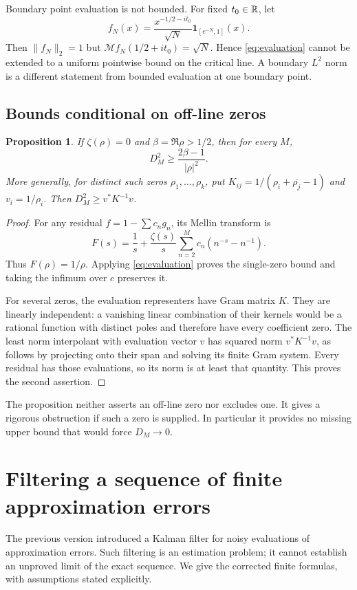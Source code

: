 \documentclass[11pt]{amsart}
\newtheorem{proposition}[theorem]{Proposition}
\theoremstyle{definition}
\begin{document}
Boundary point evaluation is not bounded. For fixed $t_0\in\mathbb R$, let
\[
 f_N(x)=\frac{x^{-1/2-it_0}}{\sqrt N}
              \boldsymbol1_{[e^{-N},1]}(x).
\]
Then $\|f_N\|_2=1$ but
$\mathcal Mf_N(1/2+it_0)=\sqrt N$.
Hence \eqref{eq:evaluation} cannot be extended to a uniform pointwise
bound on the critical line. A boundary $L^2$ norm is a different
statement from bounded evaluation at one boundary point.

\subsection{Bounds conditional on off-line zeros}
\begin{proposition}\label{prop:zerobound}
If $\zeta(\rho)=0$ and $\beta=\Re\rho>1/2$, then for every $M$,
\[
 D_M^2\ge\frac{2\beta-1}{|\rho|^2}.
\]
More generally, for distinct such zeros $\rho_1,\ldots,\rho_k$, put
$K_{ij}=1/(\rho_i+\overline{\rho_j}-1)$ and $v_i=1/\rho_i$.
Then $D_M^2\ge v^*K^{-1}v$.
\end{proposition}
\begin{proof}
For any residual $f=1-\sum c_ng_n$, its Mellin transform is
\[
 F(s)=\frac1s+\frac{\zeta(s)}s\sum_{n=2}^M c_n(n^{-s}-n^{-1}).
\]
Thus $F(\rho)=1/\rho$. Applying \eqref{eq:evaluation} proves the
single-zero bound and taking the infimum over $c$ preserves it.

For several zeros, the evaluation representers have Gram matrix $K$.
They are linearly independent: a vanishing linear combination of
their kernels would be a rational function with distinct poles and
therefore have every coefficient zero. The least norm interpolant
with evaluation vector $v$ has squared norm $v^*K^{-1}v$, as follows
by projecting onto their span and solving its finite Gram system.
Every residual has those evaluations, so its norm is at least that
quantity. This proves the second assertion.
\end{proof}

The proposition neither asserts an off-line zero nor excludes one.
It gives a rigorous obstruction if such a zero is supplied. In
particular it provides no missing upper bound that would force
$D_M\to0$.

\section{Filtering a sequence of finite approximation errors}
The previous version introduced a Kalman filter for noisy evaluations
of approximation errors. Such filtering is an estimation problem;
it cannot establish an unproved limit of the exact sequence. We give
the corrected finite formulas, with assumptions stated explicitly.
\end{document}
